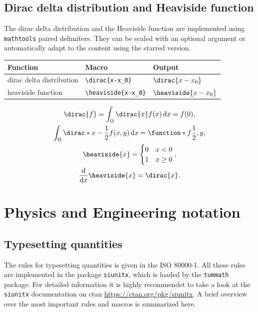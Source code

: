 \documentclass[DIV=13]{scrartcl}
\begin{document}
\subsection{Dirac delta distribution and Heaviside function}
The dirac delta distribution and the Heaviside function are implemented using
\texttt{mathtools} paired delimiters. They can be scaled with an optional
argument or automatically adapt to the content using the starred version.
\begin{center}
  \begin{tabular}{lll}
    \toprule
    \textbf{Function}        & \textbf{Macro}
                             & \textbf{Output}          \\
    \midrule
    dirac delta distribution & \verb|\dirac{x-x_0}|
                             & $\dirac{x-x_0}$          \\
    heaviside function       & \verb|\heaviside{x-x_0}|
                             & $\heaviside{x-x_0}$      \\
    \bottomrule
  \end{tabular}
\end{center}
\begin{gather}
  \dirac{f} = \int_\Omega \dirac{x}f(x)\diff x = f(0), \\
  \int_\Omega \dirac*{x - \frac{1}{2}}f(x, y)\diff x
  = \function*{f}{\frac{1}{2}, y}, \\
  \heaviside{x} = \begin{cases}
    0 & x < 0    \\
    1 & x \geq 0
  \end{cases}, \\
  \dd{}{x}\heaviside{x} = \dirac{x}.
\end{gather}


\section{Physics and Engineering notation}
\subsection{Typesetting quantities}
The rules for typesetting quantities is given in the ISO \num{80000}-1.
All these rules are implemented in the package \texttt{siunitx}, which is
loaded by the \texttt{tummath} package. For detailed information it is highly
recommendet to take a look at the \texttt{siunitx} documentation on ctan
\url{https://ctan.org/pkg/siunitx}. A brief overview over the most important
rules and macros is summarized here.
\end{document}
